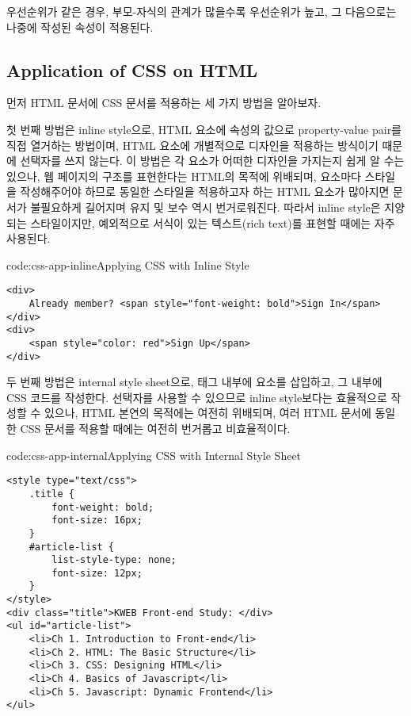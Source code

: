 우선순위가 같은 경우, 부모-자식의 관계가 많을수록 우선순위가 높고, 그 다음으로는 나중에 작성된 속성이 적용된다.

\subsection*{Application of CSS on HTML}
먼저 HTML 문서에 CSS 문서를 적용하는 세 가지 방법을 알아보자.

첫 번째 방법은 inline style으로, HTML 요소에  속성의 값으로 property-value pair를 직접 열거하는 방법이며, HTML 요소에 개별적으로 디자인을 적용하는 방식이기 때문에 선택자를 쓰지 않는다. 이 방법은 각 요소가 어떠한 디자인을 가지는지 쉽게 알 수는 있으나, 웹 페이지의 구조를 표현한다는 HTML의 목적에 위배되며, 요소마다 스타일을 작성해주어야 하므로 동일한 스타일을 적용하고자 하는 HTML 요소가 많아지면 문서가 불필요하게 길어지며 유지 및 보수 역시 번거로워진다. 따라서 inline style은 지양되는 스타일이지만, 예외적으로 서식이 있는 텍스트(rich text)를 표현할 때에는 자주 사용된다.

\begin{codeenv}{code:css-app-inline}{Applying CSS with Inline Style}\begin{verbatim}
<div>
    Already member? <span style="font-weight: bold">Sign In</span>
</div>
<div>
    <span style="color: red">Sign Up</span>
</div>
\end{verbatim}
\end{codeenv}

두 번째 방법은 internal style sheet으로,  태그 내부에  요소를 삽입하고, 그 내부에 CSS 코드를 작성한다. 선택자를 사용할 수 있으므로 inline style보다는 효율적으로 작성할 수 있으나, HTML 본연의 목적에는 여전히 위배되며, 여러 HTML 문서에 동일한 CSS 문서를 적용할 때에는 여전히 번거롭고 비효율적이다.

\begin{codeenv}{code:css-app-internal}{Applying CSS with Internal Style Sheet}\begin{verbatim}
<style type="text/css">
    .title {
        font-weight: bold;
        font-size: 16px;
    }
    #article-list {
        list-style-type: none;
        font-size: 12px;
    }
</style>
<div class="title">KWEB Front-end Study: </div>
<ul id="article-list">
    <li>Ch 1. Introduction to Front-end</li>
    <li>Ch 2. HTML: The Basic Structure</li>
    <li>Ch 3. CSS: Designing HTML</li>
    <li>Ch 4. Basics of Javascript</li>
    <li>Ch 5. Javascript: Dynamic Frontend</li>
</ul>
\end{verbatim}
\end{codeenv}
\newpage

